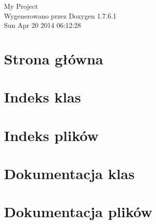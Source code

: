 \documentclass[a4paper]{book}
\begin{document}
\hypersetup{pageanchor=false,citecolor=blue}
\begin{titlepage}
\vspace*{7cm}
\begin{center}
{\Large \-My \-Project }\\
\vspace*{1cm}
{\large \-Wygenerowano przez Doxygen 1.7.6.1}\\
\vspace*{0.5cm}
{\small Sun Apr 20 2014 06:12:28}\\
\end{center}
\end{titlepage}
\clearemptydoublepage
{}
\tableofcontents
\clearemptydoublepage
{}
\hypersetup{pageanchor=true,citecolor=blue}
\chapter{\-Strona główna}
\label{index}\hypertarget{index}{}
\chapter{\-Indeks klas}

\chapter{\-Indeks plików}

\chapter{\-Dokumentacja klas}





\chapter{\-Dokumentacja plików}













\printindex
\end{document}

